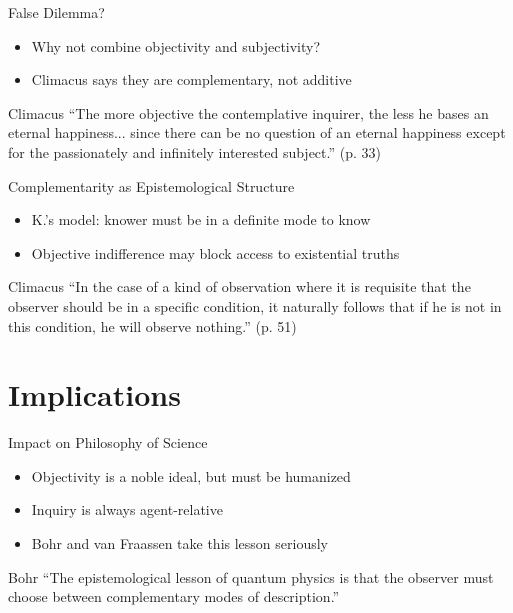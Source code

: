 \documentclass[12pt]{beamer}
\begin{document}
\begin{frame}{False Dilemma?}
\begin{itemize}
  \item Why not combine objectivity and subjectivity?
  \item Climacus says they are complementary, not additive
\end{itemize}
\begin{block}{Climacus}
“The more objective the contemplative inquirer, the less he bases an eternal happiness... since there can be no question of an eternal happiness except for the passionately and infinitely interested subject.” (p. 33)
\end{block}
\end{frame}

\begin{frame}{Complementarity as Epistemological Structure}
\begin{itemize}
  \item K.’s model: knower must be in a definite mode to know
  \item Objective indifference may block access to existential truths
\end{itemize}
\begin{block}{Climacus}
“In the case of a kind of observation where it is requisite that the observer should be in a specific condition, it naturally follows that if he is not in this condition, he will observe nothing.” (p. 51)
\end{block}
\end{frame}

\section{Implications}

\begin{frame}{Impact on Philosophy of Science}
\begin{itemize}
  \item Objectivity is a noble ideal, but must be humanized
  \item Inquiry is always agent-relative
  \item Bohr and van Fraassen take this lesson seriously
\end{itemize}
\begin{block}{Bohr}
“The epistemological lesson of quantum physics is that the observer must choose between complementary modes of description.”
\end{block}
\end{frame}
\end{document}
